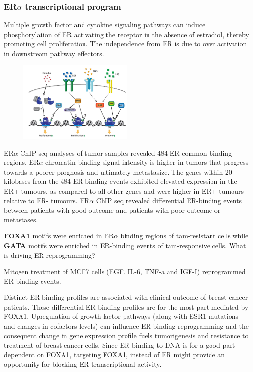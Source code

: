 \hypertarget{ertranscriptional-program}{%
\subsubsection{\texorpdfstring{ER$\alpha$ transcriptional program}{ERtranscriptional program}}\label{ertranscriptional-program}}

Multiple growth factor and cytokine signaling pathways can induce phosphorylation of ER activating the receptor in the absence of estradiol, thereby promoting cell proliferation. The independence from ER is due to over activation in downstream pathway effectors.

\begin{figure}
\centering
\includegraphics[width=0.5\textwidth]{../_resources/Screen_Shot_2022-11-18_at_11-59-02.png}
\caption{}
\end{figure}

ER$\alpha$ ChIP-seq analyses of tumor samples revealed 484 ER common binding regions. ER$\alpha$-chromatin binding signal intensity is higher in tumors that progress towards a poorer prognosis and ultimately metastasize. The genes within 20 kilobases from the 484 ER-binding events exhibited elevated expression in the ER+ tumours, as compared to all other genes and were higher in ER+ tumours relative to ER- tumours. ER$\alpha$ ChIP seq revealed differential ER-binding events between patients with good outcome and patients with poor outcome or metastases.

\textbf{FOXA1} motifs were enriched in ER$\alpha$ binding regions of tam-resistant cells while \textbf{GATA} motifs were enriched in ER-binding events of tam-responsive cells. What is driving ER reprogramming?

Mitogen treatment of MCF7 cells (EGF, IL-6, TNF-a and IGF-I) reprogrammed ER-binding events.

Distinct ER-binding profiles are associated with clinical outcome of breast cancer patients. These differential ER-binding profiles are for the most part mediated by FOXA1. Upregulation of growth factor pathways (along with ESR1 mutations and changes in cofactors levels) can influence ER binding reprogramming and the consequent change in gene expression profile fuels tumorigenesis and resistance to treatment of breast cancer cells. Since ER binding to DNA is for a good part dependent on FOXA1, targeting FOXA1, instead of ER might provide an opportunity for blocking ER transcriptional activity.

